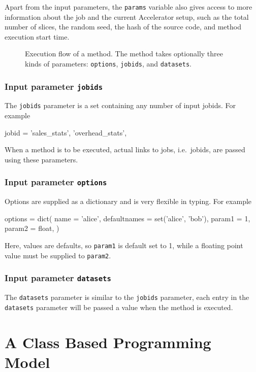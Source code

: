 Apart from the input parameters, the \texttt{params} variable also
gives access to more information about the job and the current
Accelerator setup, such as the total number of slices, the random
seed, the hash of the source code, and method execution start time.


\begin{figure}[h!]
  \begin{center}
    
    \caption{Execution flow of a method.  The method takes optionally
      three kinds of parameters: \texttt{options}, \texttt{jobids},
      and \texttt{datasets}.}
    \label{fig:execflow}
  \end{center}
\end{figure}


\subsubsection*{Input parameter \texttt{jobids}}
The \texttt{jobids} parameter is a set containing any number of input
jobids.  For example
\begin{python}
jobid = {'sales_stats', 'overhead_stats',}
\end{python}
When a method is to be executed, actual links to jobs, i.e.\ jobids,
are passed using these parameters.


\subsubsection*{Input parameter \texttt{options}}
Options are supplied as a dictionary and is very flexible in typing.  For example
\begin{python}
options = dict(
    name = 'alice',
    defaultnames = set('alice', 'bob'),
    param1 = 1,
    param2 = float,
)
\end{python}
Here, values are defaults, so \texttt{param1} is default set to 1,
while a floating point value must be supplied to \texttt{param2}.

\subsubsection*{Input parameter \texttt{datasets}}
The \texttt{datasets} parameter is similar to the \texttt{jobids}
parameter, each entry in the \texttt{datasets} parameter will be
passed a value when the method is executed.





\section{A Class Based Programming Model}

